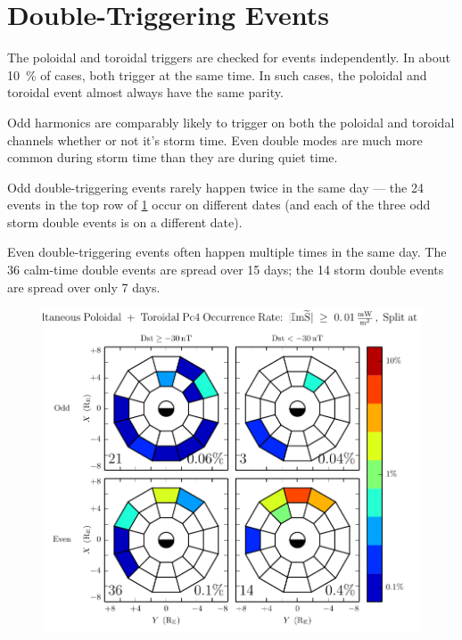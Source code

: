 \section{Double-Triggering Events}

The poloidal and toroidal triggers are checked for events independently. In about \SI{10}{\percent} of cases, both trigger at the same time. In such cases, the poloidal and toroidal event almost always have the same parity. 

Odd harmonics are comparably likely to trigger on both the poloidal and toroidal channels whether or not it's storm time. Even double modes are much more common during storm time than they are during quiet time. 

Odd double-triggering events rarely happen twice in the same day --- the 24 events in the top row of \cref{fig_double_rate} occur on  different dates (and each of the three odd storm double events is on a different date). 

Even double-triggering events often happen multiple times in the same day. The 36 calm-time double events are spread over 15 days; the 14 storm double events are spread over only 7 days. 

\begin{figure}[!htb]
    \centering
    \includegraphics[width=\textwidth]{figures/double_rate.pdf}
    \caption[Dual Poloidal + Toroidal Pc4 Events]{
      \todo{$\cdots$}
    }
    \label{fig_double_rate}
\end{figure}


